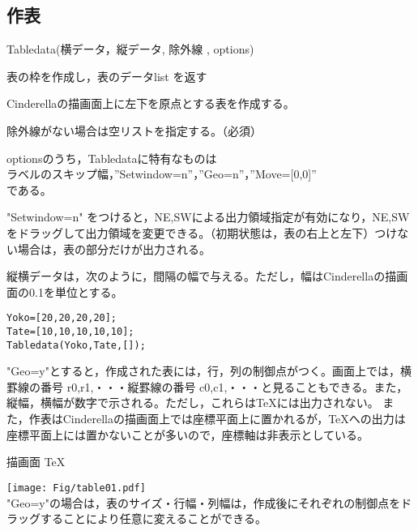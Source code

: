\documentclass[papersize,a4paper,10pt,uplatex]{jsarticle}
\begin{document}
\subsection{作表}

\begin{description}

\hypertarget{tabledata}{}
\item[関数]Tabledata(横データ，縦データ, 除外線 , options)
\item[機能]表の枠を作成し，表のデータlist を返す
\item[説明]Cinderellaの描画面上に左下を原点とする表を作成する。

除外線がない場合は空リストを指定する。（必須）

optionsのうち，Tabledataに特有なものは\\
\hspace*{3zw}ラベルのスキップ幅，''Setwindow=n''，''Geo=n''，''Move=[0,0]''\\
である。

"Setwindow=n" をつけると，NE,SWによる出力領域指定が有効になり，NE,SWをドラッグして出力領域を変更できる。（初期状態は，表の右上と左下）つけない場合は，表の部分だけが出力される。

縦横データは，次のように，間隔の幅で与える。ただし，幅はCinderellaの描画面の0.1を単位とする。

\begin{verbatim}
Yoko=[20,20,20,20];
Tate=[10,10,10,10,10];
Tabledata(Yoko,Tate,[]);
 \end{verbatim}



"Geo=y"とすると，作成された表には，行，列の制御点がつく。画面上では，横罫線の番号 r0,r1,・・・縦罫線の番号 c0,c1,・・・と見ることもできる。また，縦幅，横幅が数字で示される。ただし，これらは\TeX には出力されない。
また，作表はCinderellaの描画面上では座標平面上に置かれるが，\TeX への出力は座標平面上には置かないことが多いので，座標軸は非表示としている。

\hspace{25mm} 描画面 \hspace{45mm} TeX

\hspace{5mm}\texttt{[image: Fig/table01.pdf]} \hspace{10mm} \\


"Geo=y"の場合は，表のサイズ・行幅・列幅は，作成後にそれぞれの制御点をドラッグすることにより任意に変えることができる。


\end{description}
\end{document}
